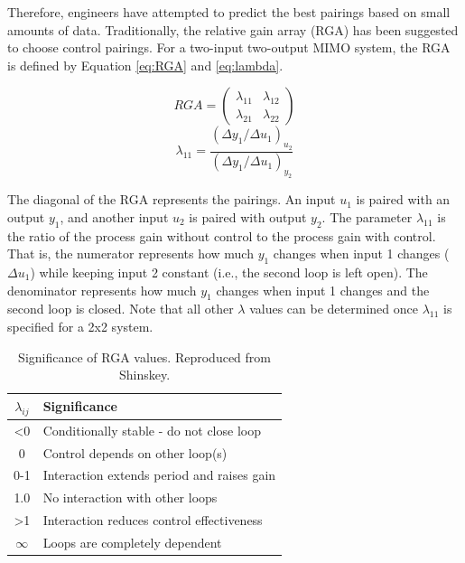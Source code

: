 Therefore, engineers have attempted to predict the best pairings based on small amounts of data. Traditionally, the relative gain array (RGA) has been suggested to choose control pairings.\citep{Shinskey1984,DeWal2001,Skogestad2007} For a two-input two-output MIMO system, the RGA is defined by Equation \ref{eq:RGA} and \ref{eq:lambda}.

\begin{equation} \label{eq:RGA}
	RGA = \begin{pmatrix} \lambda_{11} & \lambda_{12} \\ \lambda_{21} & \lambda_{22} \end{pmatrix}
\end{equation}
\begin{equation} \label{eq:lambda}
	\lambda_{11} = \frac{(\Delta y_1/\Delta u_1)_{u_2}}{(\Delta y_1/\Delta u_1)_{y_2}}
\end{equation}

The diagonal of the RGA represents the pairings. An input $u_1$ is paired with an output $y_1$, and another input $u_2$ is paired with output $y_2$. The parameter $\lambda_{11}$ is the ratio of the process gain without control to the process gain with control.\citep{Riggs2006} That is, the numerator represents how much $y_1$ changes when input 1 changes ($\Delta u_1$) while keeping input 2 constant (i.e., the second loop is left open).  The denominator represents how much $y_1$ changes when input 1 changes and the second loop is closed. Note that all other $\lambda$ values can be determined once $\lambda_{11}$ is specified for a 2x2 system.\citep{Riggs2006}


\begin{table}[bt]
  \caption{Significance of RGA values. Reproduced from Shinskey.\citep{Shinskey1984}} 
  \begin{tabular}{c l}
    \centering
    $\lambda_{ij}$ & Significance \\
    \hline
    
    <0 & Conditionally stable - do not close loop \\
    0 & Control depends on other loop(s) \\
    0-1 & Interaction extends period and raises gain \\
    1.0 & No interaction with other loops \\
    >1  & Interaction reduces control effectiveness \\
    $\infty$ & Loops are completely dependent \\
  \end{tabular}
  \label{significance_of_rga}
\end{table}

